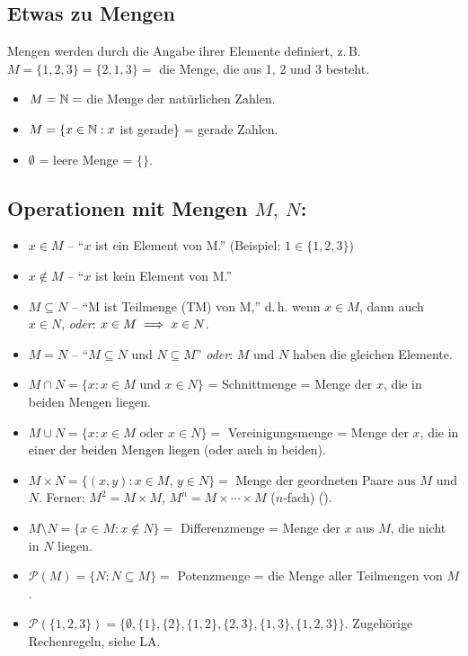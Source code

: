 \documentclass[12pt]{scrreprt}
\begin{document}
\subsection*{Etwas zu Mengen}
Mengen werden durch die Angabe ihrer Elemente definiert, z.\,B. $M = \{1, 2, 3\} = \{2, 1, 3\} =$ die Menge, die aus 1, 2 und 3 besteht.
\begin{itemize}
\item $M = \mathbb{N} =$ die Menge der natürlichen Zahlen.
\item $M = \{x\in\mathbb{N}: x$ ist gerade\} = gerade Zahlen.
\item $\emptyset$ = leere Menge = $\{\}$.
\end{itemize}

\subsection*{Operationen mit Mengen $M,\ N$:}
\begin{itemize}
\item $x \in M$ -- "`$x$ ist ein Element von M."' (Beispiel: $1 \in \{1, 2, 3\}$)
\item $x \notin M$ -- "`$x$ ist kein Element von M."'
\item $M \subseteq N$ -- "`M ist Teilmenge (TM) von M,"' d.\,h. wenn $x \in M$, dann auch $x \in N$, \emph{oder}: $x \in M \implies x \in N$.
\item $M = N$ -- "`$M \subseteq N$ und $N \subseteq M$"' \emph{oder}: $M$ und $N$ haben die gleichen Elemente.
\item $M \cap N = \{x: x \in M$ und $x \in N\}$ = Schnittmenge = Menge der $x$, die in beiden Mengen liegen.
\item $M \cup N = \{x: x \in M$ oder $x \in N\} =$ Vereinigungsmenge = Menge der $x$, die in einer der beiden Mengen liegen (oder auch in beiden).
\item $M \times N = \{(x,y): x \in M$, $y \in N\} =$ Menge der geordneten Paare aus $M$ und $N$. Ferner: $M^2 = M \times M$, $M^n = M \times \dotsb \times M$ ($n$-fach) ().
\item $M \setminus N = \{x \in M: x \notin N\} =$ Differenzmenge = Menge der $x$ aus $M$, die nicht in $N$ liegen.
\item $\mathcal{P}(M) = \{N: N \subseteq M\} =$ Potenzmenge = die Menge aller Teilmengen von $M$.
\item $\mathcal{P}(\{1, 2, 3\}) = \{\emptyset, \{1\}, \{2\}, \{1, 2\}, \{2, 3\}, \{1, 3\}, \{1, 2, 3\}\}$. Zugehörige Rechenregeln, siehe LA.
\end{itemize}
\end{document}
